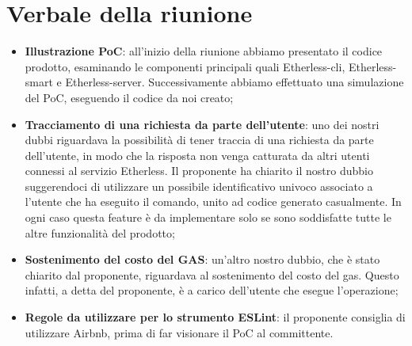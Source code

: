 \section{Verbale della riunione}
	\begin{itemize}
		\item \textbf{Illustrazione PoC}: all'inizio della riunione abbiamo presentato il codice prodotto, esaminando le componenti principali quali Etherless-cli, Etherless-smart e Etherless-server. Successivamente abbiamo effettuato una simulazione del PoC, eseguendo il codice da noi creato;
		\item \textbf{Tracciamento di una richiesta da parte dell'utente}: uno dei nostri dubbi riguardava la  possibilità di tener traccia di una richiesta da parte dell'utente, in modo che la risposta non venga catturata da altri utenti connessi al servizio Etherless. Il proponente ha chiarito il nostro dubbio suggerendoci di utilizzare un possibile identificativo univoco associato a l'utente che ha eseguito il comando, unito ad codice generato casualmente. In ogni caso questa feature è da implementare solo se sono soddisfatte tutte le altre funzionalità del prodotto;
		\item \textbf{Sostenimento del costo del GAS}: un'altro nostro dubbio, che è stato chiarito dal proponente, riguardava al sostenimento del costo del gas. Questo infatti, a detta del proponente, è a carico dell'utente che esegue l'operazione;
		\item \textbf{Regole da utilizzare per lo strumento ESLint}: il proponente consiglia di utilizzare Airbnb, prima di far visionare il PoC al committente.
	\end{itemize}
